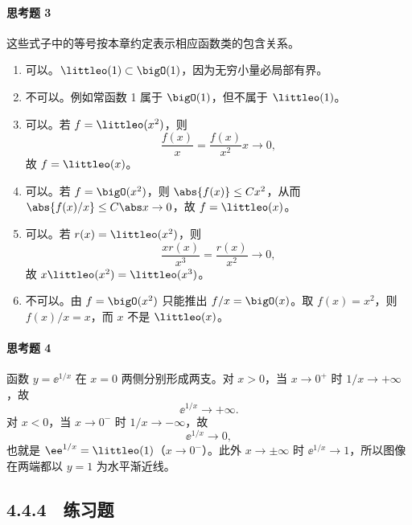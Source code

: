 \paragraph{思考题 3}
\begin{xsolution}
这些式子中的等号按本章约定表示相应函数类的包含关系。
\begin{enumerate}[label=(\arabic*)]
  \item 可以。$\littleo(1)\subset\bigO(1)$，因为无穷小量必局部有界。
  \item 不可以。例如常函数 1 属于 $\bigO(1)$，但不属于 $\littleo(1)$。
  \item 可以。若 $f=\littleo(x^2)$，则
  \[
    \frac{f(x)}x=\frac{f(x)}{x^2}x\to0,
  \]
  故 $f=\littleo(x)$。
  \item 可以。若 $f=\bigO(x^2)$，则 $\abs{f(x)}\leq Cx^2$，从而
  $\abs{f(x)/x}\leq C\abs x\to0$，故 $f=\littleo(x)$。
  \item 可以。若 $r(x)=\littleo(x^2)$，则
  \[
    \frac{x r(x)}{x^3}=\frac{r(x)}{x^2}\to0,
  \]
  故 $x\littleo(x^2)=\littleo(x^3)$。
  \item 不可以。由 $f=\bigO(x^2)$ 只能推出 $f/x=\bigO(x)$。取 $f(x)=x^2$，则
  $f(x)/x=x$，而 $x$ 不是 $\littleo(x)$。
\end{enumerate}
\end{xsolution}

\paragraph{思考题 4}
\begin{xsolution}
函数 $y=\ee^{1/x}$ 在 $x=0$ 两侧分别形成两支。对 $x>0$，当 $x\to0^+$ 时 $1/x\to+\infty$，故
\[
  \ee^{1/x}\to+\infty.
\]
对 $x<0$，当 $x\to0^-$ 时 $1/x\to-\infty$，故
\[
  \ee^{1/x}\to0,
\]
也就是 $\ee^{1/x}=\littleo(1)$（$x\to0^-$）。此外 $x\to\pm\infty$ 时 $\ee^{1/x}\to1$，所以图像在两端都以 $y=1$ 为水平渐近线。
\end{xsolution}

\subsection*{4.4.4　练习题}


